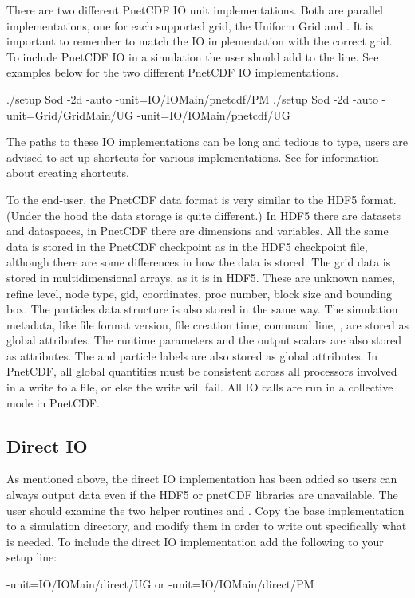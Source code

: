 There are two different PnetCDF IO unit implementations.  Both are
parallel implementations, one for each supported grid, the Uniform
Grid and \Paramesh.  It is important to remember to match the IO
implementation with the correct grid. To include PnetCDF IO in a simulation
the user should add  to the 
line.  See examples below for the two different PnetCDF IO
implementations.

\begin{codeseg}
./setup Sod -2d -auto -unit=IO/IOMain/pnetcdf/PM
./setup Sod -2d -auto -unit=Grid/GridMain/UG -unit=IO/IOMain/pnetcdf/UG
\end{codeseg}

The paths to these IO implementations can be long and tedious to type,
users are advised to set up shortcuts%
for
various implementations.  See  for
information about creating shortcuts.


To the end-user, the PnetCDF data format is very similar to the HDF5
format.  (Under the hood the data storage is quite different.)  In
HDF5 there are datasets and dataspaces, in PnetCDF there are
dimensions and variables.  All the same data is stored in the PnetCDF
checkpoint as in the HDF5 checkpoint file, although there are some
differences in how the data is stored.  The grid data is stored in
multidimensional arrays, as it is in HDF5.
These are unknown names, refine level, node type, gid, coordinates,
proc number, block size and bounding box.  The particles data
structure is also stored in the same way. The simulation metadata,
like file format version, file creation time, \setup command line,
\etc, are
stored as global attributes.  The runtime parameters and the output
scalars are also stored as attributes.  The  and particle labels
are also stored as global attributes.  In PnetCDF, all global quantities must
be consistent across all processors involved in a write to a file, or else the
write will fail.  All IO calls are run in a collective mode in PnetCDF.  


\subsection{Direct IO}
As mentioned above, the direct IO implementation has been added
so users can always output data even if the HDF5 or pnetCDF libraries are unavailable.
The user should examine the two
helper routines  and .  Copy the base implementation
to a simulation directory, and modify them in order to
write out specifically what is needed.  To include the direct IO
implementation add the following to your setup line:
\begin{codeseg}
-unit=IO/IOMain/direct/UG or -unit=IO/IOMain/direct/PM
\end{codeseg}

